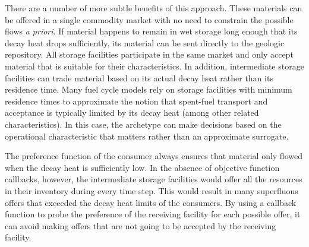 There are a number of more subtle benefits of this approach.  These materials
can be offered in a single commodity market with no need to constrain the
possible flows \textit{a priori}.  If material happens to remain in wet
storage long enough that its decay heat drops sufficiently, its material can
be sent directly to the geologic repository.  All storage facilities
participate in the same market and only accept material that is suitable for
their characteristics.  In addition, intermediate storage facilities can trade
material based on its actual decay heat rather than its residence time.  Many
fuel cycle models rely on storage facilities with minimum residence times to
approximate the notion that spent-fuel transport and acceptance is typically
limited by its decay heat (among other related characteristics).  In this
case, the archetype can make decisions based on the operational characteristic
that matters rather than an approximate surrogate.

The preference function of the consumer always ensures that material only
flowed when the decay heat is sufficiently low.  In the absence of objective
function callbacks, however, the intermediate storage facilities would offer
all the resources in their inventory during every time step.  This would
result in many superfluous offers that exceeded the decay heat limits of the
consumers.  By using a callback function to probe the preference of the
receiving facility for each possible offer, it can avoid making offers that
are not going to be accepted by the receiving facility.

 
